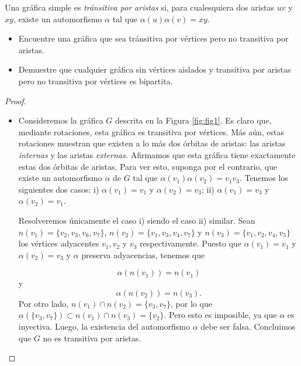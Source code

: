 \documentclass[12pt]{article}
\newenvironment{problem}[2][Problema]{\begin{trivlist}
\item[\hskip \labelsep {\bfseries #1}\hskip \labelsep {\bfseries #2.}]}{\end{trivlist}}
\begin{document}
\begin{problem}{1.2.17}
Una gráfica simple es \textit{tránsitiva por aristas} si, para cualesquiera dos aristas $uv$ y $xy$, existe un automorfismo $\alpha$ tal que $\alpha(u) \alpha(v) = xy.$
\begin{itemize}
    \item[a)] Encuentre una gráfica que sea tránsitiva por vértices pero no transitiva por aristas. 
    \item[b)] Demuestre que cualquier gráfica sin vértices aislados y transitiva por aristas pero no transitiva por vértices es bipartita.
\end{itemize}
\end{problem}
\begin{proof}\text{ }
\begin{itemize}
    \item[a)] Consideremos la gráfica $G$ descrita en la Figura \ref{fig:fig1}. Es claro que, mediante rotaciones, esta gráfica es transitiva por vértices. Más aún, estas rotaciones muestran que existen a lo más dos órbitas de aristas: las aristas \textit{internas} y las aristas \textit{externas.} Afirmamos que esta gráfica tiene exactamente estas dos órbitas de aristas. Para ver esto, suponga por el contrario, que existe un automorfismo $\alpha$ de $G$ tal que $\alpha(v_1) \alpha(v_2) = v_1 v_3.$ Tenemos los siguientes dos casos: i) $\alpha(v_1) = v_1$ y $\alpha(v_2) = v_3$; ii) $\alpha(v_1) = v_3$ y $\alpha(v_2) = v_1$.
    
    Resolveremos únicamente el caso i) siendo el caso ii) similar. Sean $n(v_1) = \{v_2, v_3, v_6, v_7\}$, $n(v_2) = \{v_1, v_3, v_4, v_7\}$ y $n(v_3) = \{v_1, v_2, v_4, v_5\}$ los vértices adyacentes $v_1, v_2$ y $v_3$ respectivamente. Puesto que $\alpha(v_1) = v_1$ y $\alpha(v_2) = v_3$ y $\alpha$ preserva adyacencias, tenemos que
    
    $$\alpha(n(v_1)) = n(v_1)$$
    y
    $$\alpha(n(v_2)) = n(v_3).$$
    Por otro lado, $n(v_1) \cap n(v_2) = \{v_3, v_7\}$, por lo que $\alpha(\{v_3, v_7\}) \subset n(v_1) \cap n(v_3) =  \{v_2\}$. Pero esto es imposible, ya que $\alpha$ es inyectiva. Luego, la existencia del automorfismo $\alpha$ debe ser falsa. Concluimos que $G$ no es transitiva por aristas. 
    
    
\begin{figure}
    \centering
        


\end{figure}
\end{itemize}
\end{proof}
\end{document}
